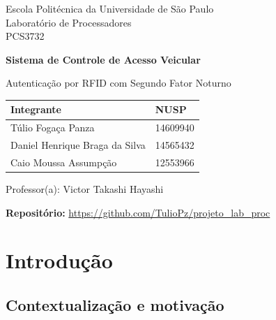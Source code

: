 \documentclass[11pt,a4paper]{article}
\begin{document}
\begin{titlepage}
\centering

\vspace*{1cm}

{\large Escola Politécnica da Universidade de São Paulo}\\[0.3cm]
{\large Laboratório de Processadores}\\[0.3cm]
{\large PCS3732}

\vspace{3.5cm}

{\Huge\bfseries Sistema de Controle de Acesso Veicular\par}
\vspace{0.6cm}
{\LARGE Autenticação por RFID com Segundo Fator Noturno\par}
\vspace{3cm}

\begin{tabular}{ll}
\toprule
\textbf{Integrante} & \textbf{NUSP} \\
\midrule
Túlio Fogaça Panza              & 14609940 \\
Daniel Henrique Braga da Silva  & 14565432 \\
Caio Moussa Assumpção           & 12553966 \\
\bottomrule
\end{tabular}

\vspace{2cm}

{\normalsize Professor(a): Victor Takashi Hayashi}\\[0.3cm]

\vfill

\begin{minipage}{0.9\textwidth}
\centering\small
\textbf{Repositório:} \url{https://github.com/TulioPz/projeto_lab_proc}\\[0.2cm]
\end{minipage}
\end{titlepage}

\section{Introdução}

\subsection{Contextualização e motivação}
\end{document}
